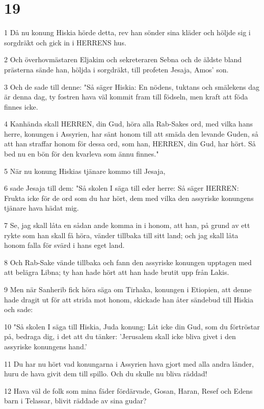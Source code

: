 \chapter{19}

\par 1 Då nu konung Hiskia hörde detta, rev han sönder sina kläder och höljde sig i sorgdräkt och gick in i HERRENS hus.
\par 2 Och överhovmästaren Eljakim och sekreteraren Sebna och de äldste bland prästerna sände han, höljda i sorgdräkt, till profeten Jesaja, Amos' son.
\par 3 Och de sade till denne: "Så säger Hiskia: En nödens, tuktans och smälekens dag är denna dag, ty fostren hava väl kommit fram till födseln, men kraft att föda finnes icke.
\par 4 Kanhända skall HERREN, din Gud, höra alla Rab-Sakes ord, med vilka hans herre, konungen i Assyrien, har sänt honom till att smäda den levande Guden, så att han straffar honom för dessa ord, som han, HERREN, din Gud, har hört. Så bed nu en bön för den kvarleva som ännu finnes."
\par 5 När nu konung Hiskias tjänare kommo till Jesaja,
\par 6 sade Jesaja till dem: "Så skolen I säga till eder herre: Så säger HERREN: Frukta icke för de ord som du har hört, dem med vilka den assyriske konungens tjänare hava hädat mig.
\par 7 Se, jag skall låta en sådan ande komma in i honom, att han, på grund av ett rykte som han skall få höra, vänder tillbaka till sitt land; och jag skall låta honom falla för svärd i hans eget land.
\par 8 Och Rab-Sake vände tillbaka och fann den assyriske konungen upptagen med att belägra Libna; ty han hade hört att han hade brutit upp från Lakis.
\par 9 Men när Sanherib fick höra säga om Tirhaka, konungen i Etiopien, att denne hade dragit ut för att strida mot honom, skickade han åter sändebud till Hiskia och sade:
\par 10 "Så skolen I säga till Hiskia, Juda konung: Låt icke din Gud, som du förtröstar på, bedraga dig, i det att du tänker: 'Jerusalem skall icke bliva givet i den assyriske konungens hand.'
\par 11 Du har nu hört vad konungarna i Assyrien hava gjort med alla andra länder, huru de hava givit dem till spillo. Och du skulle nu bliva räddad!
\par 12 Hava väl de folk som mina fäder fördärvade, Gosan, Haran, Resef och Edens barn i Telassar, blivit räddade av sina gudar?
